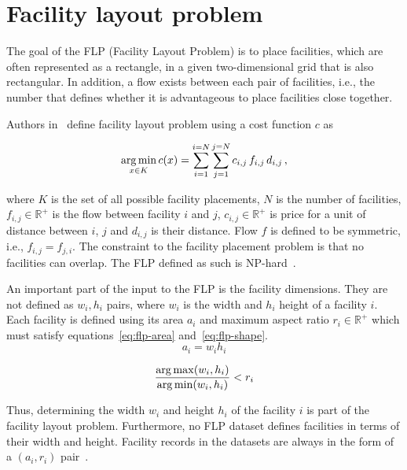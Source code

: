 \section{Facility layout problem}\label{sec:facility-layout-problem}

The goal of the FLP (Facility Layout Problem) is to place facilities, which are often represented as a rectangle,
in a given two-dimensional grid that is also rectangular.
In addition, a flow exists between each pair of facilities, i.e., the number that defines whether it is advantageous to place facilities close together.

Authors in~\cite{goncalvesBiasedRandomkeyGenetic2015} define facility layout problem using a cost function $c$ as

\begin{equation}
    \operatorname*{arg\,min}_{x \in K} c(x) = \sum\limits_{i=1}^{i=N}\sum\limits_{j=1}^{j=N}c_{i,j}\,f_{i,j}\,d_{i,j}\,,
    \label{eq:flp-objective}
\end{equation}

where $K$ is the set of all possible facility placements, $N$ is the number of facilities, $f_{i,j} \in \mathbb{R^+}$ is the flow between facility $i$ and $j$, $c_{i,j} \in \mathbb{R^+}$
is price for a unit of distance between $i$, $j$ and $d_{i,j}$ is their distance.
Flow $f$ is defined to be symmetric, i.e., $f_{i,j} = f_{j,i}$.
The constraint to the facility placement problem is that no facilities can overlap.
The FLP defined as such is NP-hard~\cite{liuMultiobjectiveParticleSwarm2018, goncalvesBiasedRandomkeyGenetic2015, friedrichIntegratedSlicingTree2018}.

An important part of the input to the FLP is the facility dimensions.
They are not defined as $w_i, h_i$ pairs, where $w_i$ is the width and $h_i$ height of a facility $i$.
Each facility is defined using its area $a_i$ and maximum aspect ratio $r_i \in \mathbb{R^+}$ which must satisfy equations~\ref{eq:flp-area} and~\ref{eq:flp-shape}.
\begin{equation}
    a_i = w_i h_i
    \label{eq:flp-area}
\end{equation}

\begin{equation}
    \dfrac{\operatorname*{arg\,max}(w_i, h_i)}{\operatorname*{arg\,min}(w_i, h_i)} < r_i
    \label{eq:flp-shape}
\end{equation}

Thus, determining the width $w_i$ and height $h_i$ of the facility $i$ is part of the facility layout problem.
Furthermore, no FLP dataset defines facilities in terms of their width and height.
Facility records in the datasets are always in the form of a $(a_i, r_i)$ pair~\cite{tamHierarchicalApproachFacility1991, dunkerCoevolutionaryAlgorithmFacility2003, liuSequencepairRepresentationMIPmodelbased2007}.

